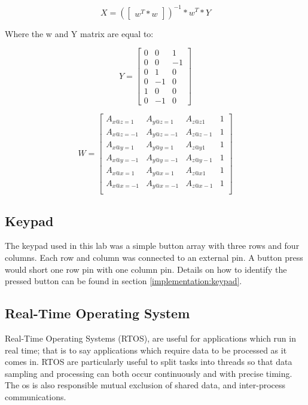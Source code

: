 \documentclass[12pt]{article}
\begin{document}
\begin{equation} \label{cal_eq:2}
 X = (\begin{bmatrix} w^{T}*w \end{bmatrix})^{-1}*w^{T} * Y
 \end{equation}

Where the w and Y matrix are equal to:

\begin{equation} \label{cal_eq:3}
 Y = \begin{bmatrix} 0 & 0 & 1  \\
            0 & 0 & -1 \\
                      0 & 1 & 0  \\
                      0 & -1 & 0 \\
                      1 & 0 & 0  \\
                      0 & -1 & 0
                      \end{bmatrix}
\end{equation}

\begin{equation} \label{cal_eq:4}
 W = \begin{bmatrix} A_{x@z=1} & A_{y@z=1} & A_{z@z1} & 1 \\
            A_{x@z=-1} & A_{y@z=-1} & A_{z@z-1} & 1 \\
                      A_{x@y=1} & A_{y@y=1} & A_{z@y1} & 1 \\
                      A_{x@y=-1} & A_{y@y=-1} & A_{z@y-1} & 1 \\
                      A_{x@x=1} & A_{y@x=1} & A_{z@x1} & 1 \\
                      A_{x@x=-1} & A_{y@x=-1} & A_{z@x-1} & 1 \\
                      \end{bmatrix}
\end{equation}
\subsection{Keypad}
The keypad used in this lab was a simple button array with three rows and four columns. Each row and column was connected to an external pin. A button press would short one row pin with one column pin. Details on how to identify the pressed button can be found in section \ref{implementation:keypad}.


\subsection{Real-Time Operating System}
Real-Time Operating Systems (RTOS), are useful for applications which run in real time; that is to say applications which require data to be processed as it comes in. RTOS are particularly useful to split tasks into threads so that data sampling and processing can both occur continuously and with precise timing. The os is also responsible mutual exclusion of shared data, and inter-process communications.
\end{document}
